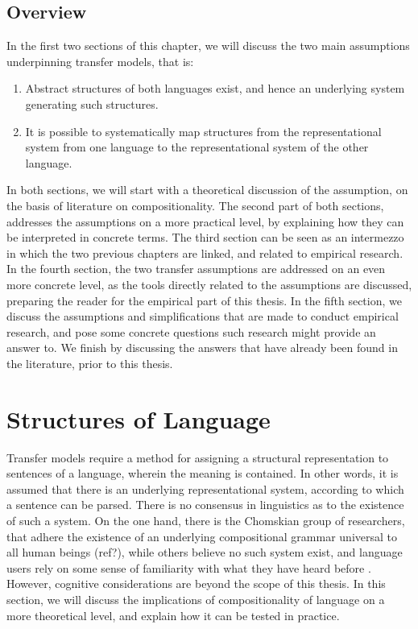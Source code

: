 \documentclass{report}
\theoremstyle{definition}
\theoremstyle{plain}
\begin{document}
\subsection*{Overview}

In the first two sections of this chapter, we will discuss the two main assumptions underpinning transfer models, that is:

\begin{enumerate}
\item Abstract structures of both languages exist, and hence an underlying system generating such structures.
\item It is possible to systematically map structures from the representational system from one language to the representational system of the other language.
\end{enumerate}

In both sections, we will start with a theoretical discussion of the assumption, on the basis of literature on compositionality. The second part of both sections, addresses the assumptions on a more practical level, by explaining how they can be interpreted in concrete terms. The third section can be seen as an intermezzo in which the two previous chapters are linked, and related to empirical research. In the fourth section, the two transfer assumptions are addressed on an even more concrete level, as the tools directly related to the assumptions are discussed, preparing the reader for the empirical part of this thesis. In the fifth section, we discuss the assumptions and simplifications that are made to conduct empirical research, and pose some concrete questions such research might provide an answer to. We finish by discussing the answers that have already been found in the literature, prior to this thesis.



\section{Structures of Language}

Transfer models require a method for assigning a structural representation to sentences of a language, wherein the meaning is contained. In other words, it is assumed that there is an underlying representational system, according to which a sentence can be parsed. There is no consensus in linguistics as to the existence of such a system. On the one hand, there is the Chomskian group of researchers, that adhere the existence of an underlying compositional grammar universal to all human beings (ref?), while others believe no such system exist, and language users rely on some sense of familiarity with what they have heard before \citep[e.g.,][]{frank2012hierarchical}. However, cognitive considerations are beyond the scope of this thesis. In this section, we will discuss the implications of compositionality of language on a more theoretical level, and explain how it can be tested in practice.
\end{document}

